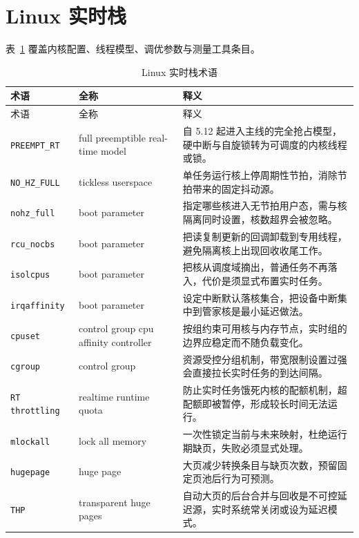 \documentclass[12pt,a4paper,fontset=fandol]{ctexbook}
\newcommand{\Tp}[1]{\texttt{#1}}
\begin{document}
\section{Linux 实时栈}

表~\ref{tab:apA-linux} 覆盖内核配置、线程模型、调优参数与测量工具条目。

\begin{longtable}{@{} >{\raggedright\arraybackslash}p{} >{\raggedright\arraybackslash}p{} >{\raggedright\arraybackslash}p{}@{}}
\caption{Linux 实时栈术语}\label{tab:apA-linux} \\
\toprule
术语 & 全称 & 释义 \\
\midrule
\endfirsthead
\toprule
术语 & 全称 & 释义 \\
\midrule
\endhead
\bottomrule
\endfoot
\endlastfoot
\Tp{PREEMPT\_RT} & full preemptible real-time model & 自 5.12 起进入主线的完全抢占模型，硬中断与自旋锁转为可调度的内核线程或锁。 \\
\Tp{NO\_HZ\_FULL} & tickless userspace & 单任务运行核上停周期性节拍，消除节拍带来的固定抖动源。 \\
\Tp{nohz\_full} & boot parameter & 指定哪些核进入无节拍用户态，需与核隔离同时设置，核数超界会被忽略。 \\
\Tp{rcu\_nocbs} & boot parameter & 把读复制更新的回调卸载到专用线程，避免隔离核上出现回收收尾工作。 \\
\Tp{isolcpus} & boot parameter & 把核从调度域摘出，普通任务不再落入，代价是须显式布置实时任务。 \\
\Tp{irqaffinity} & boot parameter & 设定中断默认落核集合，把设备中断集中到管家核是最小延迟做法。 \\
\Tp{cpuset} & control group cpu affinity controller & 按组约束可用核与内存节点，实时组的边界应稳定而不随负载变化。 \\
\Tp{cgroup} & control group & 资源受控分组机制，带宽限制设置过强会直接拉长实时任务的到达间隔。 \\
\Tp{RT throttling} & realtime runtime quota & 防止实时任务饿死内核的配额机制，超配额即被暂停，形成较长时间无法运行。 \\
\Tp{mlockall} & lock all memory & 一次性锁定当前与未来映射，杜绝运行期缺页，失败必须显式处理。 \\
\Tp{hugepage} & huge page & 大页减少转换条目与缺页次数，预留固定页池后行为可预测。 \\
\Tp{THP} & transparent huge pages & 自动大页的后台合并与回收是不可控延迟源，实时系统常关闭或设为延迟模式。 \\

\end{longtable}
\end{document}
